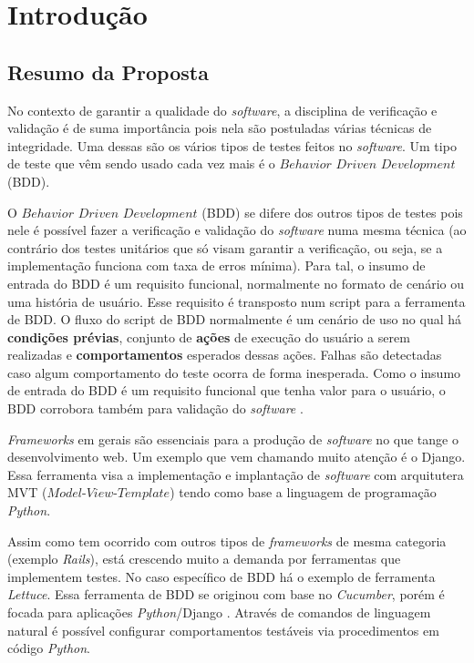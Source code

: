 \chapter[Introdução]{Introdução}

\section{Resumo da Proposta}
No contexto de garantir a qualidade do \textit{software}, a disciplina de verificação e validação é de suma importância pois nela são postuladas várias técnicas de integridade. Uma dessas são os vários tipos de testes feitos no \textit{software}. Um tipo de teste que vêm sendo usado cada vez mais é o $Behavior$ $Driven$ $Development$ (BDD).

O $Behavior$ $Driven$ $Development$ (BDD) se difere dos outros tipos de testes pois nele é possível fazer a verificação e validação do \textit{software} numa mesma técnica (ao contrário dos testes unitários que só visam garantir a verificação, ou seja, se a implementação funciona com taxa de erros mínima). Para tal, o insumo de entrada do BDD é um requisito funcional, normalmente no formato de cenário ou uma história de usuário. Esse requisito é transposto num script para a ferramenta de BDD. O fluxo do script de BDD normalmente é um cenário de uso no qual há \textbf{condições prévias}, conjunto de \textbf{ações} de execução do usuário a serem realizadas e \textbf{comportamentos} esperados dessas ações. Falhas são detectadas caso algum comportamento do teste ocorra de forma inesperada. Como o insumo de entrada do BDD é um requisito funcional que tenha valor para o usuário, o BDD corrobora também para validação do \textit{software} \cite{bdd_validacao}.

\textit{Frameworks} em gerais são essenciais para a produção de \textit{software} no que tange o desenvolvimento web. Um exemplo que vem chamando muito atenção é o Django. Essa ferramenta visa a implementação e implantação de \textit{software} com arquitutera MVT ($Model$-$View$-$Template$) tendo como base a linguagem de programação \textit{Python}.

Assim como tem ocorrido com outros tipos de \textit{frameworks} de mesma categoria (exemplo \textit{Rails}), está crescendo muito a demanda por ferramentas que implementem testes. No caso específico de BDD há o exemplo de ferramenta \textit{Lettuce}. Essa ferramenta de BDD se originou com base no \textit{Cucumber}, porém é focada para aplicações \textit{Python}/Django \cite{sale2014testing}. Através de comandos de linguagem natural é possível configurar comportamentos testáveis via procedimentos em código \textit{Python}.

